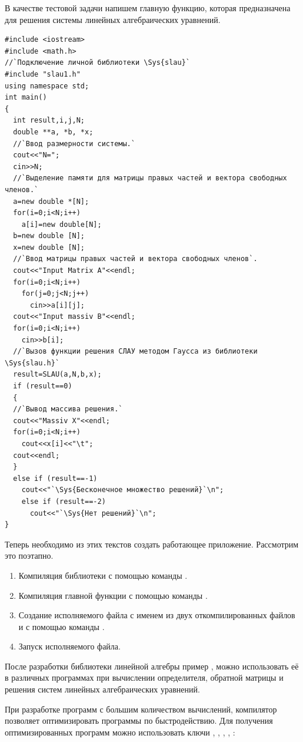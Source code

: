 В качестве тестовой задачи напишем главную функцию, которая предназначена для решения системы линейных алгебраических
уравнений.
\begin{lstlisting}
#include <iostream>
#include <math.h>
//`Подключение личной библиотеки \Sys{slau}`
#include "slau1.h"
using namespace std;
int main()
{
  int result,i,j,N;
  double **a, *b, *x; 
  //`Ввод размерности системы.`
  cout<<"N=";
  cin>>N;
  //`Выделение памяти для матрицы правых частей и вектора свободных членов.`
  a=new double *[N];
  for(i=0;i<N;i++)
    a[i]=new double[N];
  b=new double [N];
  x=new double [N];
  //`Ввод матрицы правых частей и вектора свободных членов`.
  cout<<"Input Matrix A"<<endl;
  for(i=0;i<N;i++)
    for(j=0;j<N;j++)
      cin>>a[i][j];
  cout<<"Input massiv B"<<endl;
  for(i=0;i<N;i++)
    cin>>b[i];
  //`Вызов функции решения СЛАУ методом Гаусса из библиотеки \Sys{slau.h}`
  result=SLAU(a,N,b,x);
  if (result==0)
  {
  //`Вывод массива решения.`
  cout<<"Massiv X"<<endl;
  for(i=0;i<N;i++)
    cout<<x[i]<<"\t";
  cout<<endl;
  }
  else if (result==-1)
    cout<<"`\Sys{Бесконечное множество решений}`\n";
    else if (result==-2)
      cout<<"`\Sys{Нет решений}`\n";
}
\end{lstlisting}

Теперь необходимо из этих текстов создать работающее приложение. Рассмотрим это поэтапно.

\begin{enumerate}
\item Компиляция библиотеки  с помощью команды .
\item Компиляция главной функции  с помощью команды .
\item Создание исполняемого файла с именем  из двух откомпилированных файлов  и
 с помощью команды .
\item Запуск исполняемого файла.
\end{enumerate}
После разработки библиотеки линейной алгебры пример , можно использовать её в различных программах при
вычислении определителя, обратной матрицы и решения систем линейных алгебраических уравнений.

При разработке программ с большим количеством вычислений, компилятор  позволяет оптимизировать программы по
быстродействию. Для получения оптимизированных программ можно использовать ключи , ,
, , :

